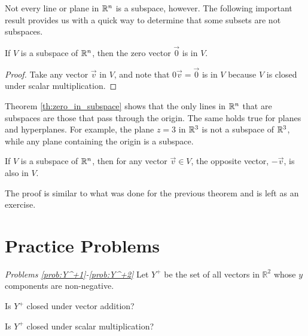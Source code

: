 \documentclass{ximera}
\begin{document}
Not every line or plane in $\mathbb{R}^n$ is a subspace, however.  The following important result provides us with a quick way to determine that some subsets are not subspaces.

\begin{theorem} \label{th:zero_in_subspace}
If $V$ is a subspace of $\mathbb{R}^n$, then the zero vector $\vec{0}$ is in $V$.
\end{theorem}
\begin{proof} 
Take any vector $\vec{v}$ in $V$, and note that $0 \vec{v} = \vec{0}$ is in $V$ because $V$ is closed under scalar multiplication.
\end{proof}

Theorem \ref{th:zero_in_subspace} shows that the only lines in $\mathbb{R}^n$ that are subspaces are those that pass through the origin.  The same holds true for planes and hyperplanes.  For example, the plane $z=3$ in $\mathbb{R}^3$ is not a subspace of $\mathbb{R}^3$, while any plane containing the origin is a subspace.

\begin{theorem} \label{th:opposite_in_subspace}
If $V$ is a subspace of $\mathbb{R}^n$, then for any vector $\vec{v} \in V$, the opposite vector, $-\vec{v}$, is also in $V$.
\end{theorem}

The proof is similar to what was done for the previous theorem and is left as an exercise.

\section*{Practice Problems}

\emph{Problems \ref{prob:Y^+1}-\ref{prob:Y^+2}}
Let $Y^+$ be the set of all vectors in $\mathbb{R}^2$ whose $y$ components are non-negative.    
 \begin{problem}\label{prob:Y^+1}
 Is $Y^+$ closed under vector addition?
 
 \begin{multipleChoice}
 \end{multipleChoice}
 \end{problem}
 
 \begin{problem}\label{prob:Y^+2}
 Is $Y^+$ closed under scalar multiplication?
 
  \begin{multipleChoice}
 \end{multipleChoice}
    \end{problem}
\end{document}

